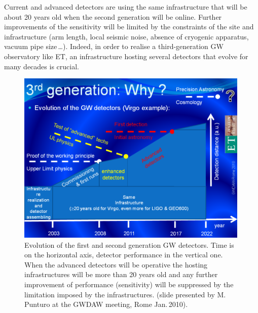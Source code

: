 Current and advanced detectors are using the same infrastructure that 
will be about 20 years old when the second generation will be online. 
Further improvements of the sensitivity will be limited by the constraints 
of the site and infrastructure (arm length, local seismic noise, absence of 
cryogenic apparatus, vacuum pipe size\,\ldots). Indeed, in order to realise 
a third-generation GW observatory like ET, an infrastructure hosting 
several detectors that evolve for many decades is crucial.


\begin{figure}
\centering
\includegraphics[width=0.99\textwidth]{Sec_Introduction/GWDAW-2010PunturoInfrastructureAdv.png}
\caption{Evolution of the first and second generation GW detectors. Time is 
on the horizontal axis, detector performance in the vertical one. When the 
advanced detectors will be operative the hosting infrastructures will be more 
than 20 years old and any further improvement of performance (sensitivity) 
will be suppressed by the limitation imposed by the infrastructures. (slide 
presented by M.\,Punturo at the GWDAW meeting, Rome Jan.\,2010).}
\label{Fig:InfraEvolution}
\end{figure}
\clearpage
